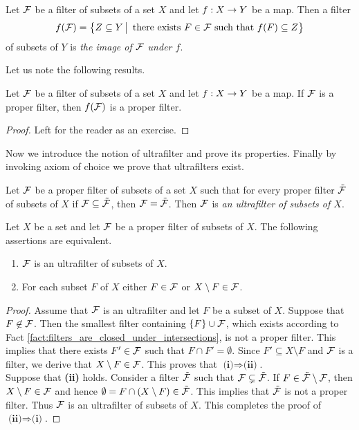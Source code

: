 \begin{definition}
Let ${\mathcal F}$ be a filter of subsets of a set $X$ and let $f:X\rightarrow Y$ be a map. Then a filter
$$f({\mathcal F}) = \big\{Z \subseteq Y\,\big|\,\mbox{ there exists }F\in {\mathcal F}\mbox{ such that }f(F)\subseteq Z\big\}$$
of subsets of $Y$ is \textit{the image of ${\mathcal F}$ under $f$}.
\end{definition}
\noindent
Let us note the following results.

\begin{fact}\label{fact:image_of_a_proper_filter_is_proper}
Let ${\mathcal F}$ be a filter of subsets of a set $X$ and let $f:X\rightarrow Y$ be a map. If ${\mathcal F}$ is a proper filter, then $f({\mathcal F})$ is a proper filter.
\end{fact}
\begin{proof}
Left for the reader as an exercise.
\end{proof}
\noindent
Now we introduce the notion of ultrafilter and prove its properties. Finally by invoking axiom of choice we prove that ultrafilters exist.

\begin{definition}
Let ${\mathcal F}$ be a proper filter of subsets of a set $X$ such that for every proper filter $\tilde{{\mathcal F}}$ of subsets of $X$ if ${\mathcal F} \subseteq \tilde{{\mathcal F}}$, then ${\mathcal F} = \tilde{{\mathcal F}}$. Then ${\mathcal F}$ is \textit{an ultrafilter of subsets of $X$}.
\end{definition}

\begin{proposition}\label{proposition:ultrafilter_contains_either_susbet_or_its_complement}
Let $X$ be a set and let ${\mathcal F}$ be a proper filter of subsets of $X$. The following assertions are equivalent.
\begin{enumerate}[label=\emph{\textbf{(\roman*)}}, leftmargin=*]
\item ${\mathcal F}$ is an ultrafilter of subsets of $X$.
\item For each subset $F$ of $X$ either $F \in {\mathcal F}$ or $X\setminus F \in {\mathcal F}$.
\end{enumerate}
\end{proposition}
\begin{proof}
Assume that ${\mathcal F}$ is an ultrafilter and let $F$ be a subset of $X$. Suppose that $F\not \in {\mathcal F}$. Then the smallest filter containing $\{F\}\cup {\mathcal F}$, which exists according to Fact \ref{fact:filters_are_closed_under_intersections}, is not a proper filter. This implies that there exists $F' \in {\mathcal F}$ such that $F\cap F' = \emptyset$. Since $F'\subseteq X\setminus F$ and ${\mathcal F}$ is a filter, we derive that $X\setminus F \in {\mathcal F}$. This proves that $\textbf{(i)}\Rightarrow \textbf{(ii)}$.\\
Suppose that \textbf{(ii)} holds. Consider a filter $\tilde{{\mathcal F}}$ such that ${\mathcal F} \subsetneq \tilde{{\mathcal F}}$. If $F \in \tilde{{\mathcal F}}\setminus {\mathcal F}$, then $X\setminus F \in {\mathcal F}$ and hence $\emptyset = F\cap \left(X\setminus F\right) \in \tilde{{\mathcal F}}$. This implies that $\tilde{{\mathcal F}}$ is not a proper filter. Thus ${\mathcal F}$ is an ultrafilter of subsets of $X$. This completes the proof of $\textbf{(ii)}\Rightarrow \textbf{(i)}$.
\end{proof}

